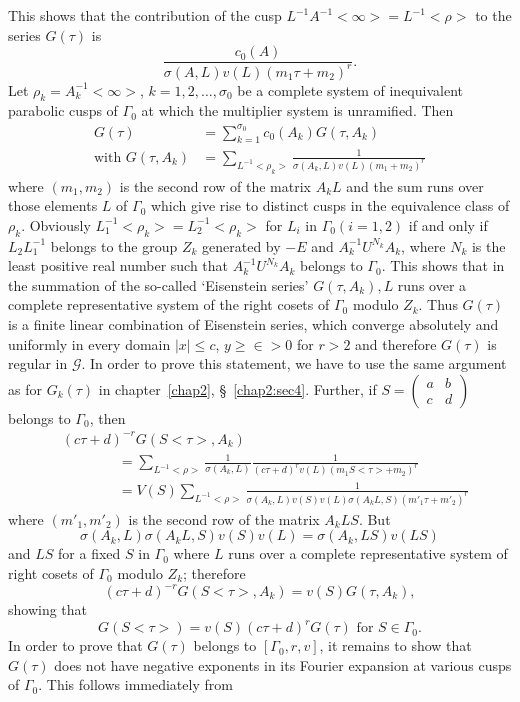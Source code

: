 This \pageoriginale shows that the contribution of the cusp
$L^{-1}A^{-1}<\infty> = L^{-1}<\rho>$ to the series $G(\tau)$ is 
$$
\frac{c_0(A)}{\sigma(A,L)v(L)(m_1\tau+m_2)^r}.
$$
Let $\rho_k=A^{-1}_k<\infty>$, $k=1,2, \ldots, \sigma_0$ be a complete
system of inequivalent parabolic cusps of $\Gamma_0$ at which the
multiplier system is unramified. Then 
\begin{align*}
G(\tau) & = \sum^{\sigma_0}_{k=1} c_0(A_k) G(\tau, A_k)\\
\text{with } G(\tau, A_k) & = \sum_{L^{-1} <\rho_k>}
\frac{1}{\sigma(A_k,L)v(L)(m_1+m_2)^r}
\end{align*}
where $(m_1, m_2)$ is the second row of the matrix $A_kL$ and the sum
runs over those elements $L$ of $\Gamma_0$ which give rise to distinct
cusps in the equivalence class of $\rho_k$. Obviously
$L^{-1}_1<\rho_k>=L^{-1}_2 <\rho_k>$ for $L_i$ in $\Gamma_0(i=1,2)$ if
and only if $L_2 L^{-1}_1$ belongs to the group $Z_k$ generated by
$-E$ and $A^{-1}_k U^{N_k} A_k$, where $N_k$ is the least positive
real number such that $A^{-1}_kU^{N_k}A_k$ belongs to $\Gamma_0$. This
shows that in the summation of the so-called `Eisenstein series'
$G(\tau, A_k), L$ runs over a complete representative system of the
right cosets of $\Gamma_0$ modulo $Z_k$. Thus $G(\tau)$ is a finite
linear combination of Eisenstein series, which converge absolutely and
uniformly in every domain $|x|\leq c$, $y\geq \in >0$ for
$r>2$ and therefore $G(\tau)$ is regular in $\mathscr{G}$. In order to
prove this statement, we have to use the same argument as for
$G_k(\tau)$ in chapter~\ref{chap2}, \S~\ref{chap2:sec4}. Further, if
$S=\left(\begin{smallmatrix} a&b\\c&d \end{smallmatrix}\right)$
belongs to $\Gamma_0$, then 
\begin{align*}
&(c\tau+d)^{-r} G(S<\tau>,A_k)\\
 &\qquad\qquad = \sum_{L^{-1}<\rho>}
  \frac{1}{\sigma(A_k,L)}
  \frac{1}{(c\tau+d)^rv(L)(m_1S<\tau>+m_2)^r}\\
&\qquad\qquad = V(S) \sum_{L^{-1}<\rho>} \frac{1}{\sigma(A_k,L)
    v(S)v(L)\sigma(A_kL,S)(m'_1\tau+m'_2)^r}         
\end{align*}\pageoriginale 
where $(m'_1,m'_2)$ is the second row of the matrix $A_k LS$. But 
$$
\sigma(A_k,L) \sigma (A_k L,S) v(S) v(L) = \sigma (A_k, LS)v(LS)
$$
and $LS$ for a fixed $S$ in $\Gamma_0$ where $L$ runs over a complete
representative system of right cosets of $\Gamma_0$ modulo $Z_k$;
therefore
$$
(c\tau+d)^{-r} G(S<\tau>,A_k) = v(S) G(\tau,A_k),
$$
showing that 
$$
G(S<\tau>) = v(S) (c\tau+d)^r G(\tau) \text{ for } S \in
\Gamma_0. 
$$
In order to prove that $G(\tau)$ belongs to $[\Gamma_0, r, v]$, it
remains to show that $G(\tau)$ does not have negative exponents in its
Fourier expansion at various cusps of $\Gamma_0$. This follows
immediately from 

